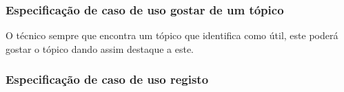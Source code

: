 
% 



% 




% 


\subsubsection{Especificação de caso de uso gostar de um tópico}

O técnico sempre que encontra um tópico que identifica como útil, este poderá gostar o tópico dando assim 
destaque a este.





% 

\subsubsection{Especificação de caso de uso registo}

